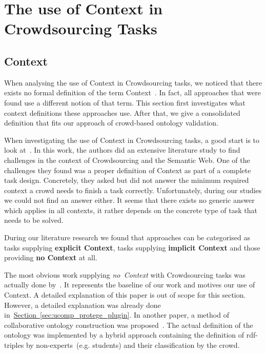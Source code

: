 
\section{The use of Context in Crowdsourcing Tasks}\label{sec:the_use_of_context_in_crowdsourcing}
% 

\subsection{Context}\label{sec:context_in_crowdsourcing_tasks_context}
When analysing the use of Context in Crowdsourcing tasks, we noticed that there exists no formal definition of the term \guillemotright Context\guillemotleft~. In fact, all approaches that were found use a different notion of that term. 
This section first investigates what context definitions these approaches use. After that, we give a consolidated definition that fits our approach of crowd-based ontology validation.

When investigating the use of Context in Crowdsourcing tasks, a good start is to look at~\cite{sarasua2015crowdsourcing}. In this work, the authors did an extensive literature study to find challenges in the context of Crowdsourcing and the Semantic Web. One of the challenges they found was a proper definition of Context as part of a complete task design. Concretely, they asked but did not answer the minimum required context a crowd needs to finish a task correctly. Unfortunately, during our studies we could not find an answer either. It seems that there exists no generic answer which applies in all contexts, it rather depends on the concrete type of task that needs to be solved. 

During our literature research we found that approaches can be categorised as tasks supplying \textbf{explicit Context}, tasks supplying \textbf{implicit Context} and those providing \textbf{no Context} at all. 

The most obvious work supplying \emph{no~Context} with Crowdsourcing tasks was actually done by~\cite{wohlgenannt2016}. It represents the baseline of our work and motives our use of Context. A detailed explanation of this paper is out of scope for this section. However, a detailed explanation was already done in~\hyperref[sec:ucomp_protege_plugin]{Section~\ref*{sec:ucomp_protege_plugin}}. In another paper, a method of collaborative ontology construction was proposed~\cite{zhitomirsky2017}. The actual definition of the ontology was implemented by a hybrid approach containing the definition of \gls{rdf}-triples by non-experts~(e.g. students) and their classification by the crowd.

